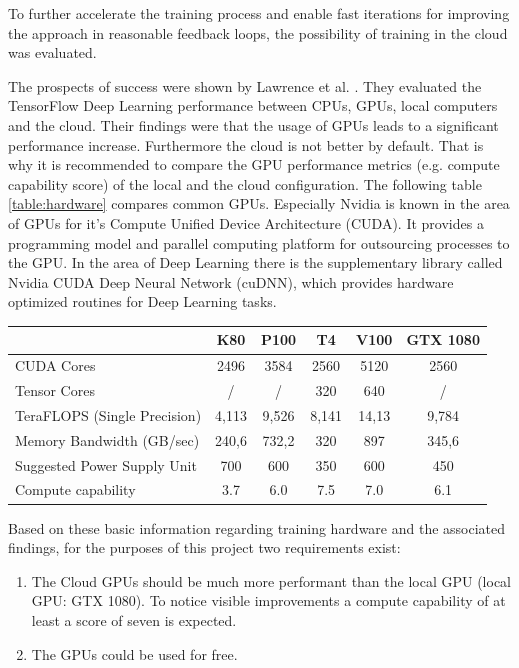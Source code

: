 To further accelerate the training process and enable fast iterations for im\-pro\-ving the approach in reasonable feedback loops, the possibility of training in the cloud was evaluated. 

The prospects of success were shown by Lawrence et al. \cite{Lawrence2017ComparingTD}. They evaluated the TensorFlow Deep Learning performance between CPUs, GPUs, local computers and the cloud. Their findings were that the usage of GPUs leads to a significant performance increase. Furthermore the cloud is not better by default. That is why it is recommended to compare the GPU performance metrics (e.g. compute capability score) of the local and the cloud configuration. The following table \ref{table:hardware} compares common GPUs.
Especially Nvidia is known in the area of GPUs for it's Compute Unified Device Ar\-chi\-tec\-tu\-re (CUDA). It provides a programming model and parallel computing platform for outsourcing processes to the GPU. In the area of Deep Learning there is the supplementary library called Nvidia CUDA Deep Neural Network (cuDNN), which provides hardware optimized routines for Deep Learning tasks.

\begin{center}
	\begin{tabular}[H]{l|c|c|c|c|c}
		& K80 & P100 & T4 & V100 & GTX 1080 \\
		\hline
		\hline
		CUDA Cores & 2496 & 3584 & 2560 & 5120 & 2560 \\
		Tensor Cores & / & / & 320 & 640 & / \\
		TeraFLOPS (Single Precision) & 4,113 & 9,526 & 8,141 & 14,13 & 9,784 \\
		Memory Bandwidth (GB/sec) & 240,6 & 732,2 & 320 & 897 & 345,6 \\
		Suggested Power Supply Unit & 700 & 600 & 350 & 600 & 450 \\
		Compute capability & 3.7 & 6.0 & 7.5 & 7.0 & 6.1 \\ 
	\end{tabular}
	\label{table:hardware}
\end{center}

Based on these basic information regarding training hardware and the associated findings, for the purposes of this project two requirements exist:
\begin{enumerate}
	\item The Cloud GPUs should be much more performant than the local GPU (local GPU: GTX 1080). To notice visible improvements a compute capability of at least a score of seven is expected.
	\item The GPUs could be used for free.
\end{enumerate}

